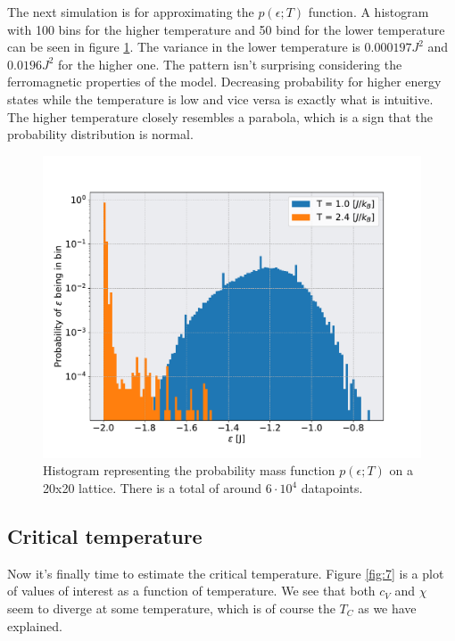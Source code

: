 \documentclass[english,notitlepage,reprint,nofootinbib]{revtex4-1}  %
\begin{document}
The next simulation is for approximating the $p(\epsilon; T)$ function. A histogram with 100 bins for the higher temperature and 50 bind for the lower temperature can be seen in figure \ref{fig:6}. The variance in the lower temperature is $0.000197J^2$ and $0.0196J^2$ for the higher one. The pattern isn't surprising considering the ferromagnetic properties of the model. Decreasing probability for higher energy states while the temperature is low and vice versa is exactly what is intuitive. The higher temperature closely resembles a parabola, which is a sign that the probability distribution is normal.

\begin{figure}[h!]
    \centering %
    \includegraphics[scale=0.35]{figures/6.pdf} %
    \caption{Histogram representing the probability mass function $p(\epsilon ; T)$ on a 20x20 lattice. There is a total of around $6 \cdot 10^4$ datapoints.}
    \label{fig:6}
\end{figure}

\subsection{Critical temperature}

Now it's finally time to estimate the critical temperature. Figure \ref{fig:7} is a plot of values of interest as a function of temperature. We see that both $c_V$ and $\chi$ seem to diverge at some temperature, which is of course the $T_C$  as we have explained. 
\end{document}
